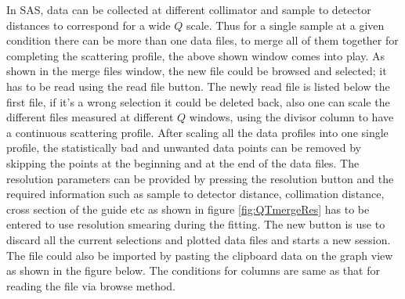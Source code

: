 In SAS, data can be collected at different collimator and sample to
detector distances to correspond for a wide $Q$ scale. Thus for a
single sample at a given condition there can be more than one data
files, to merge all of them together for completing the scattering
profile, the above shown window comes into play. As shown in the
merge files window, the new file could be browsed and selected; it
has to be read using the read file button. The newly read file
is listed below the first file, if it's a wrong selection it could
be deleted back, also one can scale the different files measured at
different $Q$ windows, using the divisor column to have a continuous
scattering profile. After scaling all the data profiles into one
single profile, the statistically bad and unwanted data points can
be removed by skipping the points at the beginning and at the end of
the data files. The resolution parameters can be provided by
pressing the resolution button and the required information such as
sample to detector distance, collimation distance, cross section of
the guide etc as shown in figure  \ref{fig:QTmergeRes} has to be entered to use
resolution smearing during the fitting. The new button is use to
discard all the current selections and plotted data files and starts
a new session. The file could also be imported by pasting the
clipboard data on the graph view as shown in the figure below. The
conditions for columns are same as that for reading the file via
browse method.


